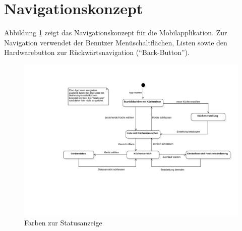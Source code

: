 \section{Navigationskonzept}
\label{sec:Navigationskonzept}

Abbildung \ref{abb:navigationConcept} zeigt das Navigationskonzept für die Mobilapplikation. Zur Navigation verwendet der Benutzer Menüschaltflächen, Listen sowie den Hardwarebutton zur Rückwärtsnavigation (\enquote{Back-Button}).

\begin{figure}[H]
    \begin{center}
        \includegraphics[trim=150 170 0 0,clip,scale=0.6]{uiux/res/navigation}
    \end{center}
    \caption{Farben zur Statusanzeige}
    \label{abb:navigationConcept}
\end{figure}

\vspace{120pt}